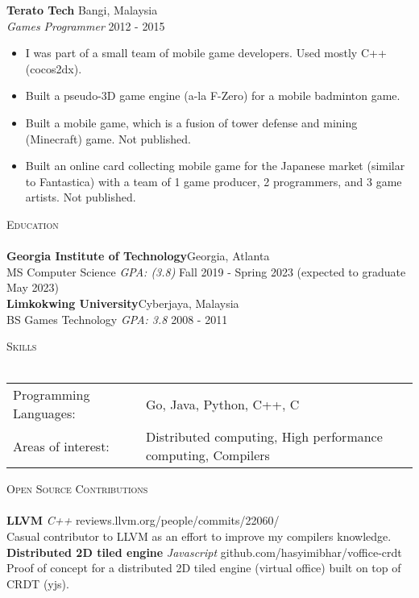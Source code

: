 \documentclass[a4paper]{article}
\newcommand{\lineunder} {
    \vspace*{-8pt} \\
    \hspace*{-18pt} \hrulefill \\
}
\newcommand{\header} [1] {
    {\hspace*{-18pt}\vspace*{6pt} \textsc{#1}}
    \vspace*{-6pt} \lineunder
}
\begin{document}
\textbf{Terato Tech} \hfill Bangi, Malaysia\\
\textit{Games Programmer} \hfill 2012 - 2015\\
\vspace{-1mm}
\begin{itemize} \itemsep 1pt
	\item I was part of a small team of mobile game developers. Used mostly C++ (cocos2dx).
	\item Built a pseudo-3D game engine (a-la F-Zero) for a mobile badminton game.
	\item Built a mobile game, which is a fusion of tower defense and mining (Minecraft) game. Not published.
	\item Built an online card collecting mobile game for the Japanese market (similar to Fantastica) with a team of 1 game producer, 2 programmers, and 3 game artists. Not published.
\end{itemize}

\header{Education}
\textbf{Georgia Institute of Technology}\hfill Georgia, Atlanta\\
MS Computer Science \textit{GPA: (3.8)} \hfill Fall 2019 - Spring 2023 (expected to graduate May 2023)\\
\vspace{2mm}
\textbf{Limkokwing University}\hfill Cyberjaya, Malaysia\\
BS Games Technology \textit{GPA: 3.8} \hfill 2008 - 2011\\
\vspace{2mm}

\header{Skills}
\begin{tabular}{ l l }
	Programming Languages: & Go, Java, Python, C++, C                                     \\
	Areas of interest:     & Distributed computing, High performance computing, Compilers \\
\end{tabular}
\vspace{2mm}

\header{Open Source Contributions}
{\textbf{LLVM}} {\sl C++} \hfill reviews.llvm.org/people/commits/22060/\\
Casual contributor to LLVM as an effort to improve my compilers knowledge.\\
\vspace*{2mm}
{\textbf{Distributed 2D tiled engine}} {\sl Javascript} \hfill github.com/hasyimibhar/voffice-crdt\\
Proof of concept for a distributed 2D tiled engine (virtual office) built on top of CRDT (yjs).\\
\vspace*{2mm}
\end{document}
